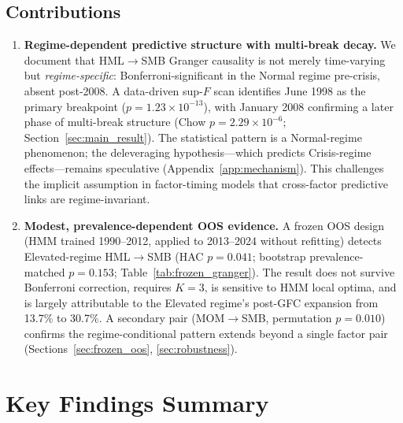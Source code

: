 \documentclass[sigconf,anonymous]{acmart}
\begin{document}
\subsection{Contributions}

\begin{enumerate}
    \item \textbf{Regime-dependent predictive structure with multi-break decay.}
    We document that HML$\to$SMB Granger causality is not merely time-varying
    but \emph{regime-specific}: Bonferroni-significant in the Normal regime
    pre-crisis, absent post-2008. A data-driven sup-$F$ scan identifies
    June 1998 as the primary breakpoint ($p = 1.23 \times 10^{-13}$), with
    January 2008 confirming a later phase of multi-break structure
    (Chow $p = 2.29 \times 10^{-6}$; Section~\ref{sec:main_result}).
    The statistical pattern is a Normal-regime phenomenon; the deleveraging
    hypothesis---which predicts Crisis-regime effects---remains speculative
    (Appendix~\ref{app:mechanism}).
    This challenges the implicit assumption
    in factor-timing models that cross-factor predictive links are
    regime-invariant.

    \item \textbf{Modest, prevalence-dependent OOS evidence.}
    A frozen OOS design (HMM trained 1990--2012, applied to 2013--2024
    without refitting) detects Elevated-regime HML$\to$SMB
    (HAC $p = 0.041$; bootstrap prevalence-matched $p = 0.153$;
    Table~\ref{tab:frozen_granger}).
    The result does not survive Bonferroni correction, requires $K = 3$,
    is sensitive to HMM local optima, and is largely attributable to the
    Elevated regime's post-GFC expansion from 13.7\% to 30.7\%.
    A secondary pair (MOM$\to$SMB, permutation $p = 0.010$) confirms
    the regime-conditional pattern extends beyond a single factor pair
    (Sections~\ref{sec:frozen_oos}, \ref{sec:robustness}).
\end{enumerate}

\section{Key Findings Summary}
\end{document}
